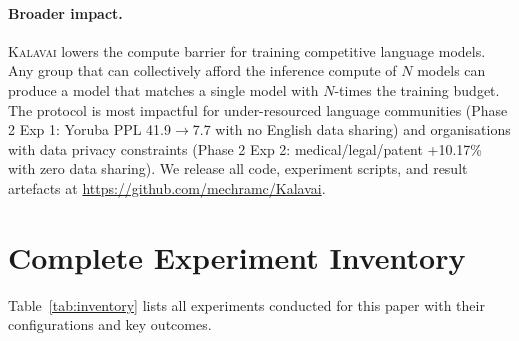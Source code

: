 \documentclass{article}
\newcommand{\kalavai}{\textsc{Kalavai}\xspace}
\begin{document}
\paragraph{Broader impact.} \kalavai lowers the compute barrier for training competitive language models. Any group that can collectively afford the inference compute of $N$ models can produce a model that matches a single model with $N$-times the training budget. The protocol is most impactful for under-resourced language communities (Phase 2 Exp 1: Yoruba PPL 41.9$\to$7.7 with no English data sharing) and organisations with data privacy constraints (Phase 2 Exp 2: medical/legal/patent +10.17\% with zero data sharing). We release all code, experiment scripts, and result artefacts at \url{https://github.com/mechramc/Kalavai}.





\appendix

\section{Complete Experiment Inventory}
\label{app:inventory}

Table~\ref{tab:inventory} lists all experiments conducted for this paper with their configurations and key outcomes.
\end{document}
